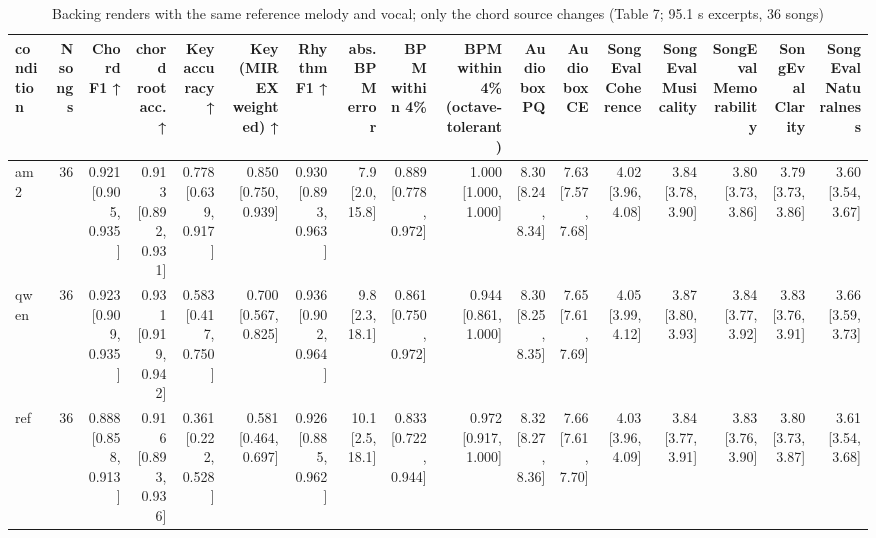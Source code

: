 \begin{table}[t]
\centering
\small
\begin{tabular}{lrrrrrrrrrrrrrrrr}
\toprule
condition & N songs & Chord F1 ↑ & chord root acc. ↑ & Key accuracy ↑ & Key (MIREX weighted) ↑ & Rhythm F1 ↑ & abs. BPM error & BPM within 4\% & BPM within 4\% (octave-tolerant) & Audiobox PQ & Audiobox CE & SongEval Coherence & SongEval Musicality & SongEval Memorability & SongEval Clarity & SongEval Naturalness \\
\midrule
am2 & 36 & 0.921 [0.905, 0.935] & 0.913 [0.892, 0.931] & 0.778 [0.639, 0.917] & 0.850 [0.750, 0.939] & 0.930 [0.893, 0.963] & 7.9 [2.0, 15.8] & 0.889 [0.778, 0.972] & 1.000 [1.000, 1.000] & 8.30 [8.24, 8.34] & 7.63 [7.57, 7.68] & 4.02 [3.96, 4.08] & 3.84 [3.78, 3.90] & 3.80 [3.73, 3.86] & 3.79 [3.73, 3.86] & 3.60 [3.54, 3.67] \\
qwen & 36 & 0.923 [0.909, 0.935] & 0.931 [0.919, 0.942] & 0.583 [0.417, 0.750] & 0.700 [0.567, 0.825] & 0.936 [0.902, 0.964] & 9.8 [2.3, 18.1] & 0.861 [0.750, 0.972] & 0.944 [0.861, 1.000] & 8.30 [8.25, 8.35] & 7.65 [7.61, 7.69] & 4.05 [3.99, 4.12] & 3.87 [3.80, 3.93] & 3.84 [3.77, 3.92] & 3.83 [3.76, 3.91] & 3.66 [3.59, 3.73] \\
ref & 36 & 0.888 [0.858, 0.913] & 0.916 [0.893, 0.936] & 0.361 [0.222, 0.528] & 0.581 [0.464, 0.697] & 0.926 [0.885, 0.962] & 10.1 [2.5, 18.1] & 0.833 [0.722, 0.944] & 0.972 [0.917, 1.000] & 8.32 [8.27, 8.36] & 7.66 [7.61, 7.70] & 4.03 [3.96, 4.09] & 3.84 [3.77, 3.91] & 3.83 [3.76, 3.90] & 3.80 [3.73, 3.87] & 3.61 [3.54, 3.68] \\
\bottomrule
\end{tabular}
\caption{Backing renders with the same reference melody and vocal; only the chord source changes (Table 7; 95.1 s excerpts, 36 songs)}
\label{tab:backing_chord_audio}
\end{table}

